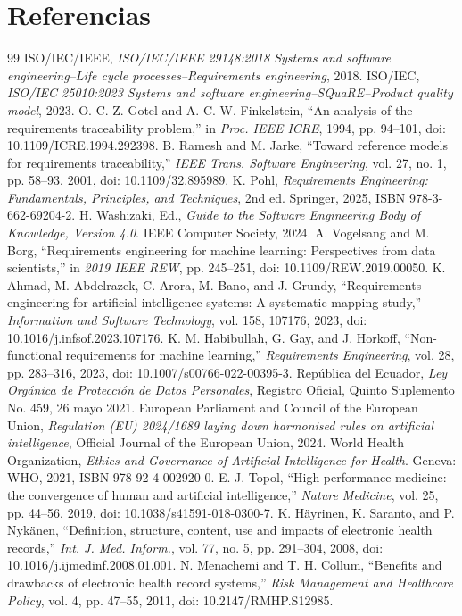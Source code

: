 \documentclass[11pt,a4paper]{article}
\begin{document}
\section*{Referencias}
\begin{thebibliography}{99}
	 ISO/IEC/IEEE, \emph{ISO/IEC/IEEE 29148:2018 Systems and software engineering--Life cycle processes--Requirements engineering}, 2018.
	 ISO/IEC, \emph{ISO/IEC 25010:2023 Systems and software engineering--SQuaRE--Product quality model}, 2023.
	 O. C. Z. Gotel and A. C. W. Finkelstein, ``An analysis of the requirements traceability problem,'' in \emph{Proc. IEEE ICRE}, 1994, pp. 94--101, doi: 10.1109/ICRE.1994.292398.
	 B. Ramesh and M. Jarke, ``Toward reference models for requirements traceability,'' \emph{IEEE Trans. Software Engineering}, vol. 27, no. 1, pp. 58--93, 2001, doi: 10.1109/32.895989.
	 K. Pohl, \emph{Requirements Engineering: Fundamentals, Principles, and Techniques}, 2nd ed. Springer, 2025, ISBN 978-3-662-69204-2.
	 H. Washizaki, Ed., \emph{Guide to the Software Engineering Body of Knowledge, Version 4.0}. IEEE Computer Society, 2024.
	 A. Vogelsang and M. Borg, ``Requirements engineering for machine learning: Perspectives from data scientists,'' in \emph{2019 IEEE REW}, pp. 245--251, doi: 10.1109/REW.2019.00050.
	 K. Ahmad, M. Abdelrazek, C. Arora, M. Bano, and J. Grundy, ``Requirements engineering for artificial intelligence systems: A systematic mapping study,'' \emph{Information and Software Technology}, vol. 158, 107176, 2023, doi: 10.1016/j.infsof.2023.107176.
	 K. M. Habibullah, G. Gay, and J. Horkoff, ``Non-functional requirements for machine learning,'' \emph{Requirements Engineering}, vol. 28, pp. 283--316, 2023, doi: 10.1007/s00766-022-00395-3.
	 República del Ecuador, \emph{Ley Orgánica de Protección de Datos Personales}, Registro Oficial, Quinto Suplemento No. 459, 26 mayo 2021.
	 European Parliament and Council of the European Union, \emph{Regulation (EU) 2024/1689 laying down harmonised rules on artificial intelligence}, Official Journal of the European Union, 2024.
	 World Health Organization, \emph{Ethics and Governance of Artificial Intelligence for Health}. Geneva: WHO, 2021, ISBN 978-92-4-002920-0.
	 E. J. Topol, ``High-performance medicine: the convergence of human and artificial intelligence,'' \emph{Nature Medicine}, vol. 25, pp. 44--56, 2019, doi: 10.1038/s41591-018-0300-7.
	 K. Häyrinen, K. Saranto, and P. Nykänen, ``Definition, structure, content, use and impacts of electronic health records,'' \emph{Int. J. Med. Inform.}, vol. 77, no. 5, pp. 291--304, 2008, doi: 10.1016/j.ijmedinf.2008.01.001.
	 N. Menachemi and T. H. Collum, ``Benefits and drawbacks of electronic health record systems,'' \emph{Risk Management and Healthcare Policy}, vol. 4, pp. 47--55, 2011, doi: 10.2147/RMHP.S12985.
\end{thebibliography}
\end{document}
